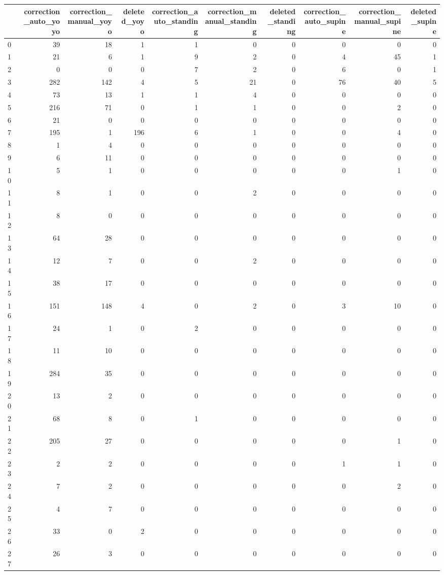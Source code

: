 \begin{tabular}{lrrrrrrrrr}
\toprule
 & correction_auto_yoyo & correction_manual_yoyo & deleted_yoyo & correction_auto_standing & correction_manual_standing & deleted_standing & correction_auto_supine & correction_manual_supine & deleted_supine \\
\midrule
0 & 39 & 18 & 1 & 1 & 0 & 0 & 0 & 0 & 0 \\
1 & 21 & 6 & 1 & 9 & 2 & 0 & 4 & 45 & 1 \\
2 & 0 & 0 & 0 & 7 & 2 & 0 & 6 & 0 & 1 \\
3 & 282 & 142 & 4 & 5 & 21 & 0 & 76 & 40 & 5 \\
4 & 73 & 13 & 1 & 1 & 4 & 0 & 0 & 0 & 0 \\
5 & 216 & 71 & 0 & 1 & 1 & 0 & 0 & 2 & 0 \\
6 & 21 & 0 & 0 & 0 & 0 & 0 & 0 & 0 & 0 \\
7 & 195 & 1 & 196 & 6 & 1 & 0 & 0 & 4 & 0 \\
8 & 1 & 4 & 0 & 0 & 0 & 0 & 0 & 0 & 0 \\
9 & 6 & 11 & 0 & 0 & 0 & 0 & 0 & 0 & 0 \\
10 & 5 & 1 & 0 & 0 & 0 & 0 & 0 & 1 & 0 \\
11 & 8 & 1 & 0 & 0 & 2 & 0 & 0 & 0 & 0 \\
12 & 8 & 0 & 0 & 0 & 0 & 0 & 0 & 0 & 0 \\
13 & 64 & 28 & 0 & 0 & 0 & 0 & 0 & 0 & 0 \\
14 & 12 & 7 & 0 & 0 & 2 & 0 & 0 & 0 & 0 \\
15 & 38 & 17 & 0 & 0 & 0 & 0 & 0 & 0 & 0 \\
16 & 151 & 148 & 4 & 0 & 2 & 0 & 3 & 10 & 0 \\
17 & 24 & 1 & 0 & 2 & 0 & 0 & 0 & 0 & 0 \\
18 & 11 & 10 & 0 & 0 & 0 & 0 & 0 & 0 & 0 \\
19 & 284 & 35 & 0 & 0 & 0 & 0 & 0 & 0 & 0 \\
20 & 13 & 2 & 0 & 0 & 0 & 0 & 0 & 0 & 0 \\
21 & 68 & 8 & 0 & 1 & 0 & 0 & 0 & 0 & 0 \\
22 & 205 & 27 & 0 & 0 & 0 & 0 & 0 & 1 & 0 \\
23 & 2 & 2 & 0 & 0 & 0 & 0 & 1 & 1 & 0 \\
24 & 7 & 2 & 0 & 0 & 0 & 0 & 0 & 2 & 0 \\
25 & 4 & 7 & 0 & 0 & 0 & 0 & 0 & 0 & 0 \\
26 & 33 & 0 & 2 & 0 & 0 & 0 & 0 & 0 & 0 \\
27 & 26 & 3 & 0 & 0 & 0 & 0 & 0 & 0 & 0 \\

\end{tabular}
